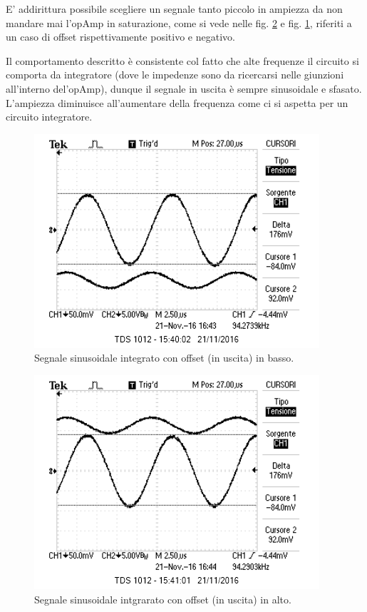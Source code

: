 \documentclass[10pt,a4paper]{article}
\begin{document}
E' addirittura possibile scegliere un segnale tanto piccolo in ampiezza da non mandare mai l'opAmp in saturazione, come si vede nelle fig. \ref{senoAlto} e fig. \ref{senoBasso}, riferiti a un caso di offset rispettivamente positivo e negativo.

Il comportamento descritto è consistente col fatto che alte frequenze il circuito si comporta da integratore (dove le impedenze sono da ricercarsi nelle giunzioni all'interno del'opAmp), dunque il segnale in uscita è sempre sinusoidale e sfasato. L'ampiezza diminuisce all'aumentare della frequenza come ci si aspetta per un circuito integratore. 

\begin{figure}[htb!]
\centering
\includegraphics[scale=1.0]{immagini/sinusoidaleinBasso.png}
\caption{Segnale sinusoidale integrato con offset (in uscita) in basso.}
\label{senoBasso}
\end{figure}


\begin{figure}[htb!]
\centering
\includegraphics[scale=1.0]{immagini/sinusoidaleinAlto.png}
\caption{Segnale sinusoidale intgrarato con offset (in uscita) in alto.}
\label{senoAlto}
\end{figure}
\end{document}
